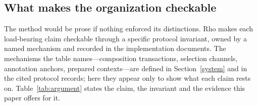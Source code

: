 \documentclass[11pt]{article}
\begin{document}
\subsection{What makes the organization checkable}\label{checkable}

The method would be prose if nothing enforced its distinctions. Rho makes each load-bearing claim checkable through a specific protocol invariant, owned by a named mechanism and recorded in the implementation documents. The mechanisms the table names---composition transactions, selection channels, annotation anchors, prepared contexts---are defined in Section~\ref{system} and in the cited protocol records; here they appear only to show what each claim rests on. Table~\ref{tab:argument} states the claim, the invariant and the evidence this paper offers for it.
\end{document}
